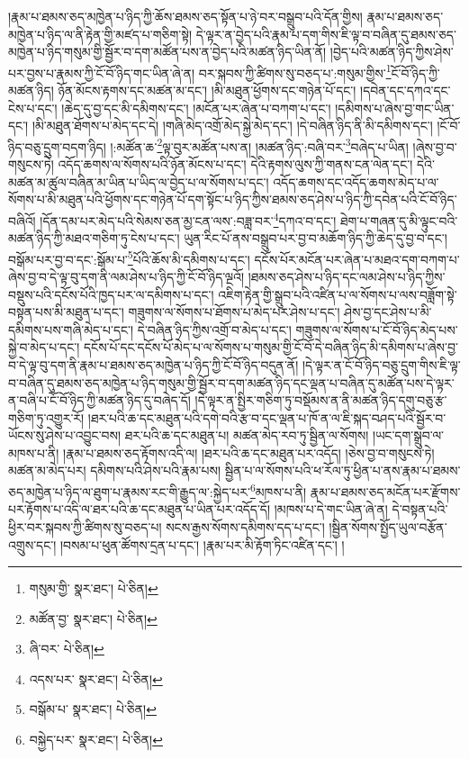།རྣམ་པ་ཐམས་ཅད་མཁྱེན་པ་ཉིད་ཀྱི་ཆོས་ཐམས་ཅད་སྟོན་པ་ཉེ་བར་བསྒྲུབ་པའི་དོན་གྱིས། རྣམ་པ་ཐམས་ཅད་མཁྱེན་པ་ཉིད་ལ་ནི་རྟེན་གྱི་མཛད་པ་གཅིག་སྟེ། དེ་ལྟར་ན་བྱེད་པའི་རྣམ་པ་དག་གིས་ཇི་ལྟ་བ་བཞིན་དུ་ཐམས་ཅད་མཁྱེན་པ་ཉིད་གསུམ་གྱི་སྦྱོར་བ་དག་མཚོན་པས་ན་བྱེད་པའི་མཚན་ཉིད་ཡིན་ནོ། །བྱེད་པའི་མཚན་ཉིད་ཀྱིས་ཤེས་པར་བྱས་པ་རྣམས་ཀྱི་ངོ་བོ་ཉིད་གང་ཡིན་ཞེ་ན། བར་སྐབས་ཀྱི་ཚིགས་སུ་བཅད་པ་:གསུམ་གྱིས་\footnote{གསུམ་གྱི་  སྣར་ཐང་།  པེ་ཅིན། }ངོ་བོ་ཉིད་ཀྱི་མཚན་ཉིད། ཉོན་མོངས་རྟགས་དང་མཚན་མ་དང་། །མི་མཐུན་ཕྱོགས་དང་གཉེན་པོ་དང་། །དབེན་དང་དཀའ་དང་ངེས་པ་དང་། །ཆེད་དུ་བྱ་དང་མི་དམིགས་དང་། །མངོན་པར་ཞེན་པ་བཀག་པ་དང་། །དམིགས་པ་ཞེས་བྱ་གང་ཡིན་དང་། །མི་མཐུན་ཐོགས་པ་མེད་དང་དེ། །གཞི་མེད་འགྲོ་མེད་སྐྱེ་མེད་དང་། །དེ་བཞིན་ཉིད་ནི་མི་དམིགས་དང་། །ངོ་བོ་ཉིད་བཅུ་དྲུག་བདག་ཉིད། །:མཚོན་ཆ་\footnote{མཚོན་བྱ་  སྣར་ཐང་།  པེ་ཅིན། }ལྟ་བུར་མཚོན་པས་ན། །མཚན་ཉིད་:བཞི་བར་\footnote{ཞི་བར་  པེ་ཅིན། }བཞེད་པ་ཡིན། །ཞེས་བྱ་བ་གསུངས་ཏེ། འདོད་ཆགས་ལ་སོགས་པའི་ཉོན་མོངས་པ་དང་། དེའི་རྟགས་ལུས་ཀྱི་གནས་ངན་ལེན་དང་། དེའི་མཚན་མ་ཚུལ་བཞིན་མ་ཡིན་པ་ཡིད་ལ་བྱེད་པ་ལ་སོགས་པ་དང་། འདོད་ཆགས་དང་འདོད་ཆགས་མེད་པ་ལ་སོགས་པ་མི་མཐུན་པའི་ཕྱོགས་དང་གཉེན་པོ་དག་སྟོང་པ་ཉིད་ཀྱིས་ཐམས་ཅད་ཤེས་པ་ཉིད་ཀྱི་དབེན་པའི་ངོ་བོ་ཉིད་བཞིའོ། །དོན་དམ་པར་མེད་པའི་སེམས་ཅན་མྱ་ངན་ལས་:བཟླ་བར་\footnote{འདས་པར་  སྣར་ཐང་།  པེ་ཅིན། }དཀའ་བ་དང་། ཐེག་པ་གཞན་དུ་མི་ལྟུང་བའི་མཚན་ཉིད་ཀྱི་མཐའ་གཅིག་ཏུ་ངེས་པ་དང་། ཡུན་རིང་པོ་ནས་བསྒྲུབ་པར་བྱ་བ་མཆོག་ཉིད་ཀྱི་ཆེད་དུ་བྱ་བ་དང་། བསྒོམ་པར་བྱ་བ་དང་:སྒོམ་པ་\footnote{བསྒོམ་པ་  སྣར་ཐང་།  པེ་ཅིན། }པོའི་ཆོས་མི་དམིགས་པ་དང་། དངོས་པོར་མངོན་པར་ཞེན་པ་མཐའ་དག་བཀག་པ་ཞེས་བྱ་བ་དེ་ལྟ་བུ་དག་ནི་ལམ་ཤེས་པ་ཉིད་ཀྱི་ངོ་བོ་ཉིད་ལྔའོ། །ཐམས་ཅད་ཤེས་པ་ཉིད་དང་ལམ་ཤེས་པ་ཉིད་ཀྱིས་བསྡུས་པའི་དངོས་པོའི་ཁྱད་པར་ལ་དམིགས་པ་དང་། འཇིག་རྟེན་གྱི་སྒྲུབ་པའི་འཛིན་པ་ལ་སོགས་པ་ལས་བཟློག་སྟེ་བསྟན་པས་མི་མཐུན་པ་དང་། གཟུགས་ལ་སོགས་པ་ཐོགས་པ་མེད་པར་ཤེས་པ་དང་། ཤེས་བྱ་དང་ཤེས་པ་མི་དམིགས་པས་གཞི་མེད་པ་དང་། དེ་བཞིན་ཉིད་ཀྱིས་འགྲོ་བ་མེད་པ་དང་། གཟུགས་ལ་སོགས་པ་ངོ་བོ་ཉིད་མེད་པས་སྐྱེ་བ་མེད་པ་དང་། དངོས་པོ་དང་དངོས་པོ་མེད་པ་ལ་སོགས་པ་གསུམ་གྱི་ངོ་བོ་དེ་བཞིན་ཉིད་མི་དམིགས་པ་ཞེས་བྱ་བ་དེ་ལྟ་བུ་དག་ནི་རྣམ་པ་ཐམས་ཅད་མཁྱེན་པ་ཉིད་ཀྱི་ངོ་བོ་ཉིད་བདུན་ནོ། །དེ་ལྟར་ན་ངོ་བོ་ཉིད་བཅུ་དྲུག་གིས་ཇི་ལྟ་བ་བཞིན་དུ་ཐམས་ཅད་མཁྱེན་པ་ཉིད་གསུམ་གྱི་སྦྱོར་བ་དག་མཚན་ཉིད་དང་ལྡན་པ་བཞིན་དུ་མཚོན་པས་དེ་ལྟར་ན་བཞི་པ་ངོ་བོ་ཉིད་ཀྱི་མཚན་ཉིད་དུ་བཞེད་དོ། །དེ་ལྟར་ན་སྤྱིར་གཅིག་ཏུ་བསྡོམས་ན་ནི་མཚན་ཉིད་དགུ་བཅུ་རྩ་གཅིག་ཏུ་འགྱུར་རོ། །ཐར་པའི་ཆ་དང་མཐུན་པའི་དགེ་བའི་རྩ་བ་དང་ལྡན་པ་ཁོ་ན་ལ་ཇི་སྐད་བཤད་པའི་སྦྱོར་བ་ཡོངས་སུ་ཤེས་པ་འབྱུང་བས། ཐར་པའི་ཆ་དང་མཐུན་པ། མཚན་མེད་རབ་ཏུ་སྦྱིན་ལ་སོགས། །ཡང་དག་སྒྲུབ་ལ་མཁས་པ་ནི། །རྣམ་པ་ཐམས་ཅད་རྟོགས་འདི་ལ། །ཐར་པའི་ཆ་དང་མཐུན་པར་འདོད། །ཅེས་བྱ་བ་གསུངས་ཏེ། མཚན་མ་མེད་པར། དམིགས་པའི་ཤེས་པའི་རྣམ་པས། སྦྱིན་པ་ལ་སོགས་པའི་ཕ་རོལ་ཏུ་ཕྱིན་པ་ནས་རྣམ་པ་ཐམས་ཅད་མཁྱེན་པ་ཉིད་ལ་ཐུག་པ་རྣམས་རང་གི་རྒྱུད་ལ་:སྐྱེད་པར་\footnote{བསྐྱེད་པར་  སྣར་ཐང་།  པེ་ཅིན། }མཁས་པ་ནི། རྣམ་པ་ཐམས་ཅད་མངོན་པར་རྫོགས་པར་རྟོགས་པ་འདི་ལ་ཐར་པའི་ཆ་དང་མཐུན་པ་ཡིན་པར་འདོད་དོ། །མཁས་པ་དེ་གང་ཡིན་ཞེ་ན། དེ་བསྟན་པའི་ཕྱིར་བར་སྐབས་ཀྱི་ཚིགས་སུ་བཅད་པ། སངས་རྒྱས་སོགས་དམིགས་དད་པ་དང་། །སྦྱིན་སོགས་སྤྱོད་ཡུལ་བརྩོན་འགྲུས་དང་། །བསམ་པ་ཕུན་ཚོགས་དྲན་པ་དང་། །རྣམ་པར་མི་རྟོག་ཏིང་འཛིན་དང་། །
